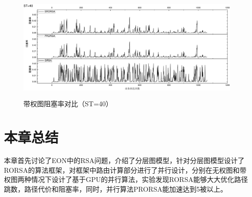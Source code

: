 \begin{figure}
\setlength{\belowcaptionskip}{-0.5cm}
\begin{center}
{\includegraphics[width=1 \textwidth]{figures/H40Z.pdf}}
\end{center}
\caption{{\footnotesize{带权图阻塞率对比（ST=40）}}}
\label{H40Z}
\end{figure}
\section{本章总结}
本章首先讨论了EON中的RSA问题，介绍了分层图模型，针对分层图模型设计了RORSA的算法框架，对框架中路由计算部分进行了并行设计，分别在无权图和带权图两种情况下设计了基于GPU的并行算法，实验发现RORSA能够大大优化路径跳数，路径代价和阻塞率，同时，并行算法PRORSA能加速达到5被以上。
